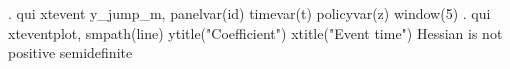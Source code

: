. qui xtevent y_jump_m, panelvar(id) timevar(t) policyvar(z) window(5) 
{\smallskip}
. qui xteventplot, smpath(line) ytitle("Coefficient") xtitle("Event time")
Hessian is not positive semidefinite
{\smallskip}
